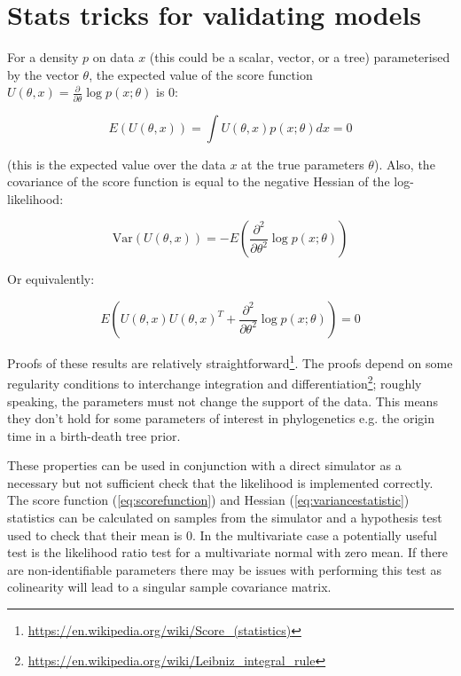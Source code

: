 \documentclass[oneside,twocolumn]{article}
\begin{document}






\section{Stats tricks for validating models}


For a density $p$ on data $x$ (this could be a scalar, vector, or a tree) parameterised by the vector $\theta$, the expected value of the score function $U(\theta,x)=\frac{\partial}{\partial\theta}\log p(x;\theta)$ is 0:

\begin{equation}\label{eq:scorefunction}
E(U(\theta,x)) = \int U(\theta,x)p(x;\theta)dx = 0
\end{equation}

(this is the expected value over the data $x$ at the true parameters $\theta$). Also, the covariance of the score function is equal to the negative Hessian of the log-likelihood:

$$
\textrm{Var}(U(\theta, x))=-E\left(\frac{\partial^2}{\partial\theta^2}\log p(x;\theta)\right)
$$

Or equivalently:

\begin{equation}\label{eq:variancestatistic}
E\left(U(\theta, x)U(\theta, x)^T + \frac{\partial^2}{\partial\theta^2}\log p(x;\theta)\right)=0 
\end{equation}

Proofs of these results are relatively straightforward\footnote{\url{https://en.wikipedia.org/wiki/Score_(statistics)}}. The proofs depend on some regularity conditions to interchange integration and differentiation\footnote{\url{https://en.wikipedia.org/wiki/Leibniz_integral_rule}}; roughly speaking, the parameters must not change the support of the data. This means they don't hold for some parameters of interest in phylogenetics e.g. the origin time in a birth-death tree prior.

These properties can be used in conjunction with a direct simulator as a necessary but not sufficient check that the likelihood is implemented correctly. The score function (\ref{eq:scorefunction}) and Hessian (\ref{eq:variancestatistic}) statistics can be calculated on samples from the simulator and a hypothesis test used to check that their mean is 0. In the multivariate case a potentially useful test is the likelihood ratio test for a multivariate normal with zero mean. If there are non-identifiable parameters there may be issues with performing this test as colinearity will lead to a singular sample covariance matrix.
\end{document}
